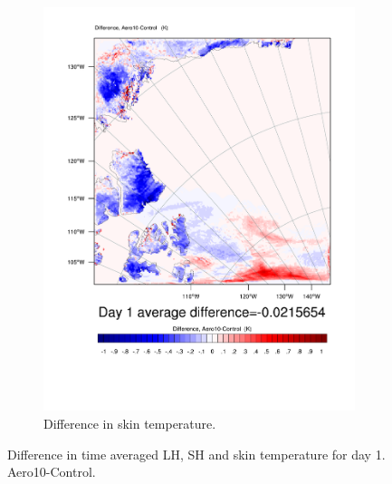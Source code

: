 \begin{figure}
	\begin{subfigure}{0.48\textwidth}
		\includegraphics[width=\textwidth]{results/aero10/diff_Aero10_TSK_Day1.pdf}
		\caption{Difference in skin temperature.}
		\label{subfig:skin_r3Day1}
	\end{subfigure}
	\caption{Difference in time averaged LH, SH and skin temperature for day 1. Aero10-Control.}
	\label{fig:lhshskin_r3Day1}
\end{figure}

\clearpage
